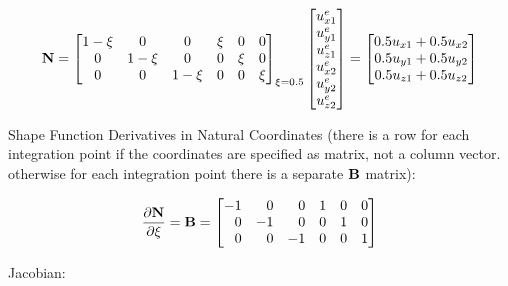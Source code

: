 \begin{equation}
    \mathbf{N} = \begin{bmatrix}
        1 - \xi & 0 & 0 & \xi & 0 & 0 \\
        0 & 1 - \xi & 0 & 0 & \xi & 0  \\
        0 & 0 & 1 - \xi & 0 & 0 & \xi \\
    \end{bmatrix}_{\xi = 0.5}
    \begin{bmatrix}
        u_{x1}^e \\
        u_{y1}^e \\
        u_{z1}^e \\
        u_{x2}^e \\
        u_{y2}^e \\
        u_{z2}^e \\
    \end{bmatrix}
    = \begin{bmatrix}
        0.5 u_{x1} + 0.5 u_{x2} \\
        0.5 u_{y1} + 0.5 u_{y2} \\
        0.5 u_{z1} + 0.5 u_{z2} \\
    \end{bmatrix}
\end{equation}

Shape Function Derivatives in Natural Coordinates (there is a row for each
integration point if the coordinates are specified as matrix, not a column
vector. otherwise for each integration point there is a separate $ \mathbf{B} $
matrix):

\begin{equation}
    \frac{\partial \mathbf{N}}{\partial \xi} =
    \mathbf{B} = \begin{bmatrix}
        -1 & \phantom{-}0 & \phantom{-}0 & 1 & 0 & 0 \\
        \phantom{-}0 & -1 & \phantom{-}0 & 0 & 1 & 0  \\
        \phantom{-}0 & \phantom{-}0 & -1 & 0 & 0 & 1  \\
    \end{bmatrix}
\end{equation}

Jacobian:

